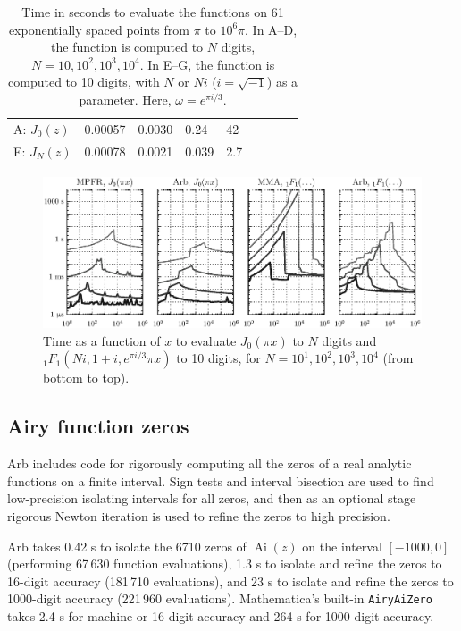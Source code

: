 \documentclass[11pt,a4paper]{article}
\begin{document}
\begin{table}
\begin{center}
\begin{scriptsize}
\begin{tabular}{l | l l l l | l l l l}
A: $J_0(z)$   & 0.00057  &  0.0030   &  0.24  &  42 & & & & \\
E: $J_N(z)$   & 0.00078  &  0.0021   &  0.039 &  2.7 & & & & \\
\end{tabular}
\end{scriptsize}
\caption{Time in seconds to evaluate the functions on 61 exponentially spaced points from $\pi$ to $10^6 \pi$.
In A--D, the function is computed to $N$ digits, $N = 10, 10^2, 10^3, 10^4$.
In E--G, the function is computed to 10 digits, with $N$ or $Ni$ ($i = \sqrt{-1}$) as a parameter. Here, $\omega = e^{\pi i / 3}$.}
\label{tab:ultrabenchmark}
\end{center}
\end{table}

\begin{figure}[!htb]
\centering
\includegraphics[scale=0.59]{timings.eps}
\caption{Time as a function of $x$ to evaluate $J_0(\pi x)$ to $N$ digits and ${}_1F_1(Ni,1+i,e^{\pi i / 3} \pi x)$ to 10 digits,
for $N = 10^1, 10^2, 10^3, 10^4$ (from bottom to top).}
\label{fig:timings}
\end{figure}

\subsection{Airy function zeros}

Arb includes code for rigorously computing
all the zeros of a real analytic functions on a finite interval.
Sign tests and interval bisection are used
to find low-precision isolating intervals for all zeros,
and then as an optional stage rigorous Newton iteration
is used to refine the zeros to high precision.

Arb takes 0.42 s to isolate the 6710 zeros of
$\operatorname{Ai}(z)$ on the interval $[-1000,0]$
(performing 67\,630 function evaluations),
1.3 s to isolate and refine the zeros to 16-digit accuracy (181\,710 evaluations),
and 23 s to isolate and refine the zeros to 1000-digit accuracy
(221\,960 evaluations).
Mathematica's built-in \texttt{AiryAiZero} takes 2.4 s for
machine or 16-digit accuracy and 264 s for 1000-digit accuracy.
\end{document}
